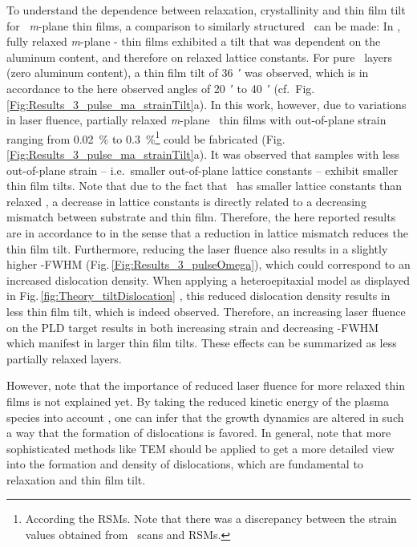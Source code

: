 To understand the dependence between relaxation, crystallinity and thin film tilt for \cro\ \textit{m}-plane thin films, a comparison to similarly structured \agao\ can be made:
In \textcite{kneiss2021}, fully relaxed \textit{m}-plane \textalpha- thin films exhibited a tilt that was dependent on the aluminum content, and therefore on relaxed lattice constants.
For pure \agao\ layers (zero aluminum content), a thin film tilt of \qty{36}{\arcminute} was observed, which is in accordance to the here observed angles of \qty{20}{\arcminute} to \qty{40}{\arcminute} (cf.\ Fig.\,\ref{Fig:Results_3_pulse_ma_strainTilt}a).
In this work, however, due to variations in laser fluence, partially relaxed \textit{m}-plane \cro\ thin films with out-of-plane strain ranging from \qty{0.02}{\percent} to \qty{0.3}{\percent}\footnote{
    According the RSMs. Note that there was a discrepancy between the strain values obtained from \thetaomega\ scans and RSMs.
} could be fabricated (Fig.\,\ref{Fig:Results_3_pulse_ma_strainTilt}a).
It was observed that samples with less out-of-plane strain -- i.e.\ smaller out-of-plane lattice constants -- exhibit smaller thin film tilts.
Note that due to the fact that \alo\ has smaller lattice constants than relaxed \cro, a decrease in lattice constants is directly related to a decreasing mismatch between substrate and thin film.
Therefore, the here reported results are in accordance to \textcite{kneiss2021} in the sense that a reduction in lattice mismatch reduces the thin film tilt.
Furthermore, reducing the laser fluence also results in a slightly higher \textomega-FWHM (Fig.\,\ref{Fig:Results_3_pulseOmega}), which could correspond to an increased dislocation density.
When applying a heteroepitaxial model as displayed in Fig.\,\ref{fig:Theory_tiltDislocation}
    \cite{grundmann2016},
this reduced dislocation density results in less thin film tilt, which is indeed observed.
Therefore, an increasing laser fluence on the PLD target results in both increasing strain and decreasing \textomega-FWHM which manifest in larger thin film tilts.
These effects can be summarized as less partially relaxed layers.

However, note that the importance of reduced laser fluence for more relaxed thin films is not explained yet.
By taking the reduced kinetic energy of the plasma species into account
    \cite{anisimov1996},
one can infer that the growth dynamics are altered in such a way that the formation of dislocations is favored.
In general, note that more sophisticated methods like \gls{TEM} should be applied to get a more detailed view into the formation and density of dislocations, which are fundamental to relaxation and thin film tilt.

